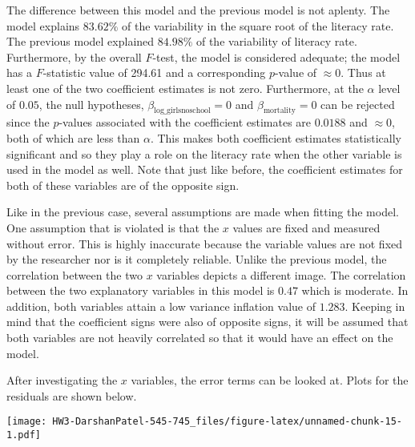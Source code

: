 \documentclass[]{article}
\begin{document}
The difference between this model and the previous model is not aplenty.
The model explains \(83.62\%\) of the variability in the square root of
the literacy rate. The previous model explained \(84.98\%\) of the
variability of literacy rate. Furthermore, by the overall \(F\)-test,
the model is considered adequate; the model has a \(F\)-statistic value
of 294.61 and a corresponding \(p\)-value of \(\approx 0\). Thus at
least one of the two coefficient estimates is not zero. Furthermore, at
the \(\alpha\) level of \(0.05\), the null hypotheses,
\(\beta_{\text{log_girlsnoschool}} = 0\) and
\(\beta_{\text{mortality}} = 0\) can be rejected since the \(p\)-values
associated with the coefficient estimates are \(0.0188\) and
\(\approx 0\), both of which are less than \(\alpha\). This makes both
coefficient estimates statistically significant and so they play a role
on the literacy rate when the other variable is used in the model as
well. Note that just like before, the coefficient estimates for both of
these variables are of the opposite sign.

Like in the previous case, several assumptions are made when fitting the
model. One assumption that is violated is that the \(x\) values are
fixed and measured without error. This is highly inaccurate because the
variable values are not fixed by the researcher nor is it completely
reliable. Unlike the previous model, the correlation between the two
\(x\) variables depicts a different image. The correlation between the
two explanatory variables in this model is \(0.47\) which is moderate.
In addition, both variables attain a low variance inflation value of
\(1.283\). Keeping in mind that the coefficient signs were also of
opposite signs, it will be assumed that both variables are not heavily
correlated so that it would have an effect on the model.

After investigating the \(x\) variables, the error terms can be looked
at. Plots for the residuals are shown below.

\texttt{[image: HW3-DarshanPatel-545-745\_files/figure-latex/unnamed-chunk-15-1.pdf]}
\end{document}
